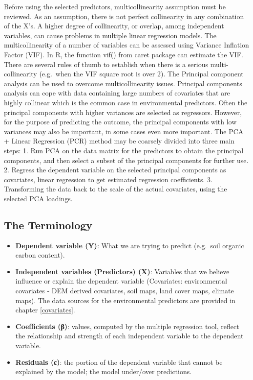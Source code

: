 \documentclass[10pt,b5paper,]{book}
\providecommand{\tightlist}{%
  \setlength{\itemsep}{0pt}\setlength{\parskip}{0pt}}
\theoremstyle{definition}
\theoremstyle{definition}
\theoremstyle{definition}
\theoremstyle{remark}
\begin{document}
Before using the selected predictors, multicollinearity assumption must
be reviewed. As an assumption, there is not perfect collinearity in any
combination of the X's. A higher degree of collinearity, or overlap,
among independent variables, can cause problems in multiple linear
regression models. The multicollinearity of a number of variables can be
assessed using Variance Inflation Factor (VIF). In R, the function vif()
from caret package can estimate the VIF. There are several rules of
thumb to establish when there is a serious multi-collinearity (e.g.~when
the VIF square root is over 2). The Principal component analysis can be
used to overcome multicollinearity issues. Principal components analysis
can cope with data containing large numbers of covariates that are
highly collinear which is the common case in environmental predictors.
Often the principal components with higher variances are selected as
regressors. However, for the purpose of predicting the outcome, the
principal components with low variances may also be important, in some
cases even more important. The PCA + Linear Regression (PCR) method may
be coarsely divided into three main steps: 1. Run PCA on the data matrix
for the predictors to obtain the principal components, and then select a
subset of the principal components for further use. 2. Regress the
dependent variable on the selected principal components as covariates,
linear regression to get estimated regression coefficients. 3.
Transforming the data back to the scale of the actual covariates, using
the selected PCA loadings.

\hypertarget{the-terminology}{%
\subsection{The Terminology}\label{the-terminology}}

\begin{itemize}
\tightlist
\item
  \textbf{Dependent variable (Y)}: What we are trying to predict
  (e.g.~soil organic carbon content).
\item
  \textbf{Independent variables (Predictors) (X)}: Variables that we
  believe influence or explain the dependent variable (Covariates:
  environmental covariates - DEM derived covariates, soil maps, land
  cover maps, climate maps). The data sources for the environmental
  predictors are provided in chapter \ref{covariates}.
\item
  \textbf{Coefficients (β)}: values, computed by the multiple regression
  tool, reflect the relationship and strength of each independent
  variable to the dependent variable.
\item
  \textbf{Residuals (ε)}: the portion of the dependent variable that
  cannot be explained by the model; the model under/over predictions.
\end{itemize}
\end{document}
